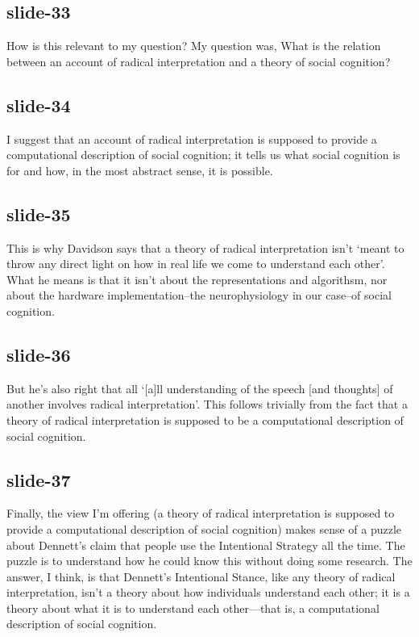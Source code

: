 \documentclass[12pt,\papersize]{extarticle}
\begin{document}
\subsection{slide-33}
How is this relevant to my question?
My question was, What is the relation between an account of radical interpretation
and a theory of social cognition?

\subsection{slide-34}
I suggest that an account of radical interpretation is supposed to provide
a computational description of social cognition; it tells us what social
cognition is for and how, in the most abstract sense, it is possible.

\subsection{slide-35}
This is why Davidson says that a theory of radical interpretation isn’t
‘meant to throw any direct light on how in real life we come to understand each other’.
What he means is that it isn’t about the representations and algorithsm, nor about the
hardware implementation--the neurophysiology in our case--of social cognition.

\subsection{slide-36}
But he’s also right that all
‘[a]ll understanding of the speech [and thoughts] of another involves radical interpretation’.
This follows trivially from the fact that
a theory of radical interpretation is supposed to be a computational description
of  social cognition.

\subsection{slide-37}
Finally, the view I’m offering (a theory of radical interpretation is supposed to provide
a computational description of social cognition) makes sense of a puzzle about
Dennett’s claim that people use the Intentional Strategy all the time.
The puzzle is to understand how he could know this without doing some research.
The answer, I think, is that Dennett’s Intentional Stance, like any theory of
radical interpretation, isn’t a theory about how individuals understand each other;
it is a theory about what it is to understand each other---that is, a computational
description of social cognition.
\end{document}
